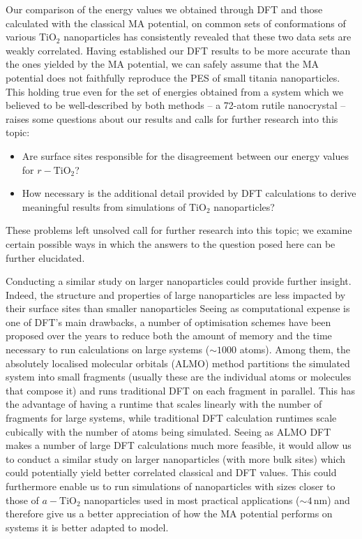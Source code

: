\documentclass[aps,prb,twocolumn,amsmath,amssymb,superscriptaddress,longbibliography]{revtex4-1}
\newcommand\tab[1][1cm]{\hspace*{#1}} %
\begin{document}
\tab Our comparison of the energy values we obtained through DFT and those calculated with the classical MA potential, on common sets of conformations of various $\text{TiO}_2$ nanoparticles has consistently revealed that these two data sets are weakly correlated.
Having established our DFT results to be more accurate than the ones yielded by the MA potential, we can safely assume that the MA potential does not faithfully reproduce the PES of small titania nanoparticles.
This holding true even for the set of energies obtained from a system which we believed to be well-described by both methods -- a 72-atom rutile nanocrystal -- raises some questions about our results and calls for further research into this topic:
\begin{itemize}
\item Are surface sites responsible for the disagreement between our energy values for $r-\text{TiO}_2$?
\item How necessary is the additional detail provided by DFT calculations to derive meaningful results from simulations of $\text{TiO}_2$ nanoparticles? 
\end{itemize}
These problems left unsolved call for further research into this topic; we examine certain possible ways in which the answers to the question posed here can be further elucidated.

\tab Conducting a similar study on larger nanoparticles could provide further insight.
Indeed, the structure and properties of large nanoparticles are less impacted by their surface sites than smaller nanoparticles\cite{}
Seeing as computational expense is one of DFT's main drawbacks, a number of optimisation schemes have been proposed over the years to reduce both the amount of memory and the time necessary to run calculations on large systems ($\sim 1000$ atoms).
Among them, the absolutely localised molecular orbitals\cite{almo} (ALMO) method partitions the simulated system into small fragments (usually these are the individual atoms or molecules that compose it) and runs traditional DFT on each fragment in parallel.
This has the advantage of having a runtime that scales linearly with the number of fragments for large systems, while traditional DFT calculation runtimes scale cubically with the number of atoms being simulated.
Seeing as ALMO DFT makes a number of large DFT calculations much more feasible, it would allow us to conduct a similar study on larger nanoparticles (with more bulk sites) which could potentially yield better correlated classical and DFT values.
This could furthermore enable us to run simulations of nanoparticles with sizes closer to those of $a-\text{TiO}_2$ nanoparticles used in most practical applications ($\sim 4\,$nm\cite{realistic_nnp}) and therefore give us a better appreciation of how the MA potential performs on systems it is better adapted to model.
\end{document}
